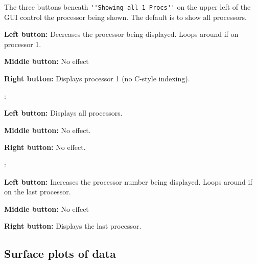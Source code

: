 \documentclass[12pt,oneside]{article}
\begin{document}
The three buttons beneath \verb+''Showing all 1 Procs''+ on the upper left of the GUI control the processor
being shown.  The default is to show all processors.  
\begin{list}{}
\item \button{$<--$}
\begin{list}{}
\item {\bf Left button:} Decreases the processor being displayed.  Loops around if on processor 1.
\item {\bf Middle button:} No effect
\item {\bf Right button:} Displays processor 1 (no C-style indexing).
\end{list}
\item {}:
\begin{list}{}
\item {\bf Left button:} Displays all processors.
\item {\bf Middle button:} No effect.
\item {\bf Right button:} No effect.
\end{list}
\item \button{$-->$}:
\begin{list}{}
\item {\bf Left button:} Increases the processor number being displayed.  Loops around if on the last processor.
\item {\bf Middle button:} No effect
\item {\bf Right button:} Displays the last processor.
\end{list}
\end{list}

\subsection{Surface plots of data}
\end{document}

